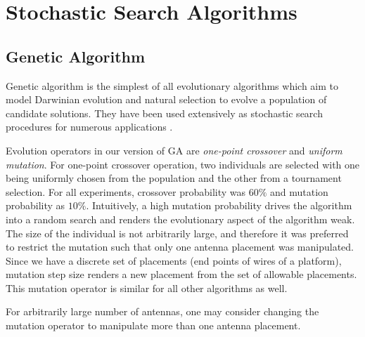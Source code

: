 \documentclass[conference]{IEEEtran}
\begin{document}
\section{Stochastic Search Algorithms}
\label{sec:algorithms}
\subsection{Genetic Algorithm}
\label{sec:algorithms-ga}
Genetic algorithm is the simplest of all evolutionary algorithms which aim to model Darwinian evolution and natural selection to evolve a population of candidate solutions. They have been used extensively as stochastic search procedures for numerous applications \cite{fogel1994}.

Evolution operators in our version of GA are \textit{one-point crossover} and \textit{uniform mutation}. For one-point crossover operation, two individuals are selected with one being uniformly chosen from the population and the other from a tournament selection. For all experiments, crossover probability was $60\%$ and mutation probability as $10\%$. Intuitively, a high mutation probability drives the algorithm into a random search and renders the evolutionary aspect of the algorithm weak. The size of the individual is not arbitrarily large, and therefore it was preferred to restrict the mutation such that only one antenna placement was manipulated. Since we have a discrete set of placements (end points of wires of a platform), mutation step size renders a new placement from the set of allowable placements. This mutation operator is similar for all other algorithms as well.

For arbitrarily large number of antennas, one may consider changing the mutation operator to manipulate more than one antenna placement. 
\end{document}

